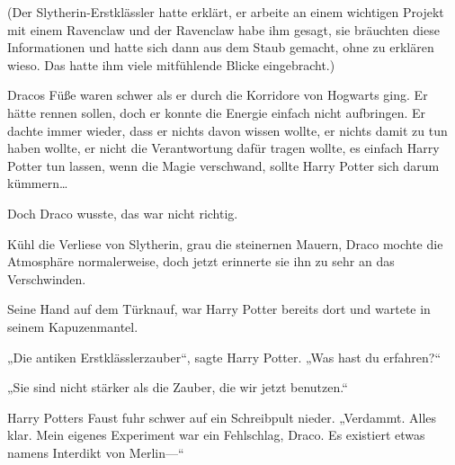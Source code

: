 (Der Slytherin-Erstklässler hatte erklärt, er arbeite an einem wichtigen Projekt mit einem Ravenclaw und der Ravenclaw habe ihm gesagt, sie bräuchten diese Informationen und hatte sich dann aus dem Staub gemacht, ohne zu erklären wieso. Das hatte ihm viele mitfühlende Blicke eingebracht.)

Dracos Füße waren schwer als er durch die Korridore von Hogwarts ging. Er hätte rennen sollen, doch er konnte die Energie einfach nicht aufbringen. Er dachte immer wieder, dass er nichts davon wissen wollte, er nichts damit zu tun haben wollte, er nicht die Verantwortung dafür tragen wollte, es einfach Harry Potter tun lassen, wenn die Magie verschwand, sollte Harry Potter sich darum kümmern…

Doch Draco wusste, das war nicht richtig.

Kühl die Verliese von Slytherin, grau die steinernen Mauern, Draco mochte die Atmosphäre normalerweise, doch jetzt erinnerte sie ihn zu sehr an das Verschwinden.

Seine Hand auf dem Türknauf, war Harry Potter bereits dort und wartete in seinem Kapuzenmantel.

„Die antiken Erstklässlerzauber“, sagte Harry Potter. „Was hast du erfahren?“

„Sie sind nicht stärker als die Zauber, die wir jetzt benutzen.“

Harry Potters Faust fuhr schwer auf ein Schreibpult nieder. „Verdammt. Alles klar. Mein eigenes Experiment war ein Fehlschlag, Draco. Es existiert etwas namens Interdikt von Merlin—“

